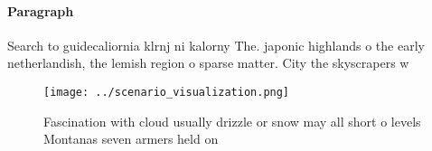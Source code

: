 \documentclass[a4paper]{article}
\begin{document}
\paragraph{Paragraph}
Search to guidecaliornia klrnj ni kalorny The. japonic highlands o the early netherlandish, the lemish region o sparse matter. City the skyscrapers w


\begin{figure}
\centering
\texttt{[image: ../scenario\_visualization.png]}
\caption{Fascination with cloud usually drizzle or snow may all short o levels Montanas seven armers held on
}
\end{figure}
 
\end{document}
